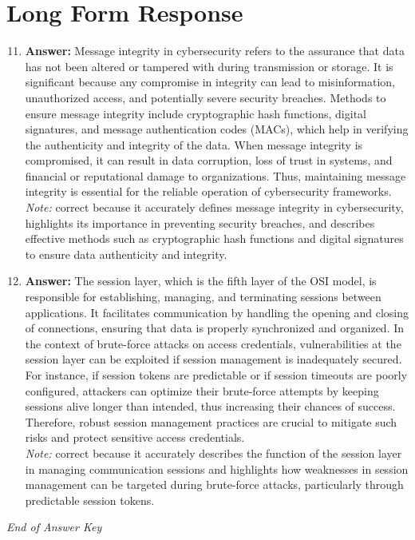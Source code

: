 \documentclass[12pt]{article}
\begin{document}
\section*{Long Form Response}
\begin{enumerate}[label=\arabic*.]
\setcounter{enumi}{10}
\item \textbf{Answer:} Message integrity in cybersecurity refers to the assurance that data has not been altered or tampered with during transmission or storage. It is significant because any compromise in integrity can lead to misinformation, unauthorized access, and potentially severe security breaches. Methods to ensure message integrity include cryptographic hash functions, digital signatures, and message authentication codes (MACs), which help in verifying the authenticity and integrity of the data. When message integrity is compromised, it can result in data corruption, loss of trust in systems, and financial or reputational damage to organizations. Thus, maintaining message integrity is essential for the reliable operation of cybersecurity frameworks.
\\ \textit{Note:} correct because it accurately defines message integrity in cybersecurity, highlights its importance in preventing security breaches, and describes effective methods such as cryptographic hash functions and digital signatures to ensure data authenticity and integrity.
\item \textbf{Answer:} The session layer, which is the fifth layer of the OSI model, is responsible for establishing, managing, and terminating sessions between applications. It facilitates communication by handling the opening and closing of connections, ensuring that data is properly synchronized and organized. In the context of brute-force attacks on access credentials, vulnerabilities at the session layer can be exploited if session management is inadequately secured. For instance, if session tokens are predictable or if session timeouts are poorly configured, attackers can optimize their brute-force attempts by keeping sessions alive longer than intended, thus increasing their chances of success. Therefore, robust session management practices are crucial to mitigate such risks and protect sensitive access credentials.
\\ \textit{Note:} correct because it accurately describes the function of the session layer in managing communication sessions and highlights how weaknesses in session management can be targeted during brute-force attacks, particularly through predictable session tokens.
\end{enumerate}

\vfill
\noindent\textit{End of Answer Key}
\end{document}
